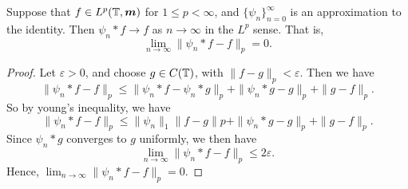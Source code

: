 \documentclass{owmaths}
\begin{document}
\begin{proposition}
    Suppose that $f \in L^p(\mathbb{T},\boldsymbol{m})$ for $1 \leq p < \infty$, and $\{\psi_n\}_{n=0}^\infty$
    is an approximation to the identity. Then $\psi_n * f\rightarrow f$ as $n\rightarrow \infty$
    in the $L^p$ sense. That is,
    \begin{equation*}
        \lim_{n\rightarrow\infty} \|\psi_n*f-f\|_p = 0.
    \end{equation*}
\end{proposition}
\begin{proof}
    Let $\varepsilon > 0$, and choose $g \in C(\mathbb{T})$, with $\|f-g\|_p < \varepsilon$. 
    Then we have
    \begin{equation*}
        \|\psi_n*f-f\|_p \leq \|\psi_n*f-\psi_n*g\|_p + \|\psi_n*g-g\|_p + \|g-f\|_p.
    \end{equation*}
    So by young's inequality, we have
    \begin{equation*}
        \|\psi_n*f-f\|_p \leq \|\psi_n\|_1 \|f-g\|p + \|\psi_n*g-g\|_p + \|g-f\|_p.
    \end{equation*}
    Since $\psi_n*g$ converges to $g$ uniformly, we then have
    \begin{equation*}
        \lim_{n\rightarrow\infty} \|\psi_n*f-f\|_p \leq 2\varepsilon.
    \end{equation*}
    Hence, $\lim_{n\rightarrow\infty} \|\psi_n*f-f\|_p = 0$.
\end{proof}
\end{document}
